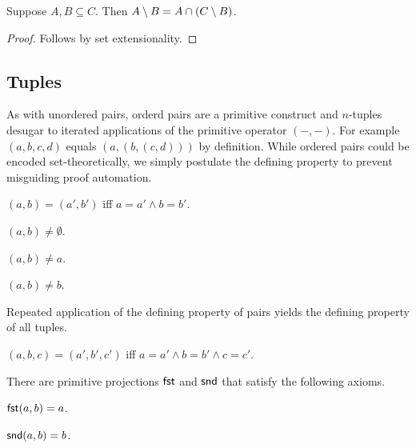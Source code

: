 \begin{proposition}\label{setminus_eq_inter_complement}
    Suppose $A, B\subseteq C$.
    Then $A\setminus B = A\cap (C\setminus B)$.
\end{proposition}
\begin{proof}
    Follows by set extensionality.
\end{proof}

\subsection{Tuples}

As with unordered pairs,
orderd pairs are a primitive construct and
$n$-tuples desugar to iterated applications of the
primitive operator $({-},{-})$.
For example $(a, b, c, d)$ equals $(a, (b, (c, d)))$ by definition.
While ordered pairs could be encoded set-theoretically, %
we simply postulate the defining property to prevent misguiding
proof automation.

\begin{axiom}\label{pair_eq_iff}
    $(a, b) = (a', b')$ iff $a = a'\land b = b'$.
\end{axiom}

\begin{axiom}\label{pair_neq_emptyset}
    $(a, b) \neq \emptyset$.
\end{axiom}

\begin{axiom}\label{pair_neq_fst}
    $(a, b) \neq a$.
\end{axiom}

\begin{axiom}\label{pair_neq_snd}
    $(a, b) \neq b$.
\end{axiom}

Repeated application of the defining property of pairs yields the defining property of
all tuples.

\begin{proposition}\label{triple_eq_iff}
    $(a, b, c) = (a', b', c')$ iff $a = a' \land b = b'\land c = c'$.
\end{proposition}

There are primitive projections $\operatorname{\mathsf{fst}}$ and $\operatorname{\mathsf{snd}}$ that satisfy the following axioms.

\begin{axiom}\label{fst_eq}
    $\operatorname{\mathsf{fst}}(a, b) = a$.
\end{axiom}

\begin{axiom}\label{snd_eq}
    $\operatorname{\mathsf{snd}}(a, b) = b$.
\end{axiom}


